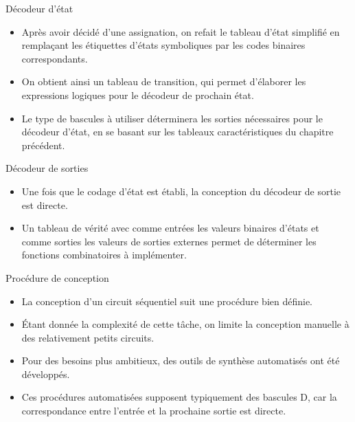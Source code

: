 \documentclass[presentation]{beamer}
\begin{document}
\begin{frame}[label={sec:org8b68560}]{Décodeur d'état}
\begin{itemize}
\item Après avoir décidé d'une assignation, on refait le tableau d'état simplifié en remplaçant les étiquettes d'états symboliques par les codes binaires correspondants.

\item On obtient ainsi un \alert{tableau de transition}, qui permet d'élaborer les expressions logiques pour le décodeur de prochain état.

\item Le type de bascules à utiliser déterminera les sorties nécessaires pour le décodeur d'état, en se basant sur les tableaux caractéristiques du chapitre précédent.
\end{itemize}
\end{frame}

\begin{frame}[label={sec:org8781cad}]{Décodeur de sorties}
\begin{itemize}
\item Une fois que le codage d'état est établi, la conception du décodeur de sortie est directe.

\item Un tableau de vérité avec comme entrées les valeurs binaires d'états et comme sorties les valeurs de sorties externes permet de déterminer les fonctions combinatoires à implémenter.
\end{itemize}
\end{frame}

\begin{frame}[label={sec:org0ec8731}]{Procédure de conception}
\begin{itemize}
\item La conception d'un circuit séquentiel suit une procédure bien définie.

\item Étant donnée la complexité de cette tâche, on limite la conception manuelle à des relativement petits circuits.

\item Pour des besoins plus ambitieux, des outils de synthèse automatisés ont été développés.

\item Ces procédures automatisées supposent typiquement des bascules D, car la correspondance entre l'entrée et la prochaine sortie est directe.
\end{itemize}
\end{frame}
\end{document}
